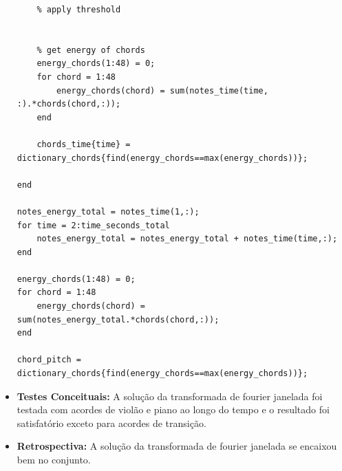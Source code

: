 \begin{itemize}
\begin{lstlisting}
    % apply threshold
    

    % get energy of chords
    energy_chords(1:48) = 0;
    for chord = 1:48
        energy_chords(chord) = sum(notes_time(time, :).*chords(chord,:));
    end

    chords_time{time} = dictionary_chords{find(energy_chords==max(energy_chords))};

end

notes_energy_total = notes_time(1,:);
for time = 2:time_seconds_total
    notes_energy_total = notes_energy_total + notes_time(time,:);
end

energy_chords(1:48) = 0;
for chord = 1:48
    energy_chords(chord) = sum(notes_energy_total.*chords(chord,:));
end

chord_pitch = dictionary_chords{find(energy_chords==max(energy_chords))};
\end{lstlisting}
\item \textbf{Testes Conceituais:} A solução da transformada de fourier janelada foi testada com acordes de violão e piano ao longo do tempo e o resultado foi satisfatório exceto para acordes de transição.
\item \textbf{Retrospectiva:} A solução da transformada de fourier janelada se encaixou bem no conjunto.  
\end{itemize}


